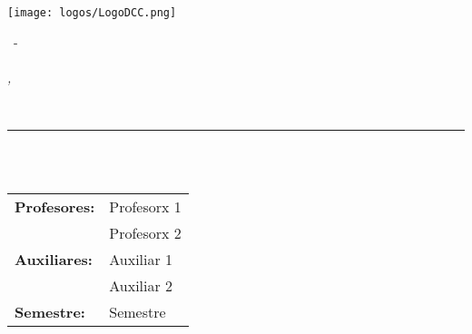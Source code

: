 \begin{minipage}{0.4\textwidth}
  \texttt{[image: logos/LogoDCC.png]}
\end{minipage}
\hfill
\begin{minipage}{0.6\textwidth}
  \begin{flushright}
    \textsc{\codigoCurso\ - \nombreCurso} \\
    \fecha \\
    \small{\textit{\ciudad, \pais}}
  \end{flushright}
  \vspace{-0.45cm}
\end{minipage}
\\[2ex]
\rule{\linewidth}{0.2 mm}

\begin{center}
  {\Large
    \textbf{\titulo} \\
    \textit{\subtitulo} \\
  }
  \begin{tabular}{l l}
    \textbf{Profesores:}    & Profesorx 1     \\
                            & Profesorx 2  \\
    \textbf{Auxiliares:}  & Auxiliar 1 \\
                          & Auxiliar 2    \\
    \textbf{Semestre:}    & Semestre
  \end{tabular}
\end{center}